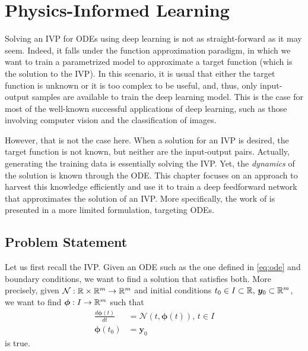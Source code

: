 \chapter{Physics-Informed Learning}\label{ch:pinn}

Solving an \gls{IVP} for \gls{ODE}s using deep learning is not as straight-forward as it may seem.
Indeed, it falls under the function approximation paradigm, in which we want to train a parametrized model to approximate a target function (which is the solution to the \gls{IVP}).
In this scenario, it is usual that either the target function is unknown or it is too complex to be useful, and, thus, only input-output samples are available to train the deep learning model.
This is the case for most of the well-known successful applications of deep learning, such as those involving computer vision and the classification of images. %

However, that is not the case here.
When a solution for an \gls{IVP} is desired, the target function is not known, but neither are the input-output pairs.
Actually, generating the training data is essentially solving the \gls{IVP}.
Yet, the \emph{dynamics} of the solution is known through the \gls{ODE}.
This chapter focuses on an approach to harvest this knowledge efficiently and use it to train a deep feedforward network that approximates the solution of an \gls{IVP}.
More specifically, the work of \textcite{Raissi2019} is presented in a more limited formulation, targeting \gls{ODE}s\footnotemark.

\section{Problem Statement}

Let us first recall the \gls{IVP}.
Given an \gls{ODE} such as the one defined in \eqref{eq:ode} and boundary conditions, we want to find a solution that satisfies both.
More precisely, given $\mathcal{N}:\mathbb{R}\times \mathbb{R}^m\to \mathbb{R}^{m}$ and initial conditions $t_0\in I\subset \mathbb{R},\,\bm{y}_0\subset \mathbb{R}^{m}$, we want to find $\bm{\phi}:I\to \mathbb{R}^{m}$ such that
\begin{align*}
    \frac{d \bm{\phi}(t)}{d t} &= \mathcal{N}\left( t, \bm{\phi}(t) \right),\,t\in I \\
    \bm{\phi}(t_0) &= \bm{y}_0
\end{align*}
is true.


